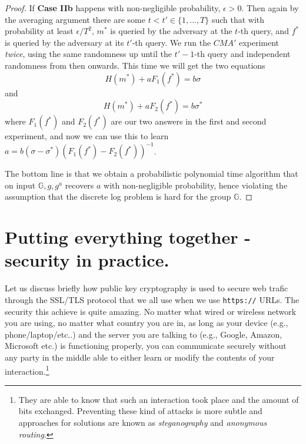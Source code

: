 \begin{proof}
If \textbf{Case IIb} happens with non-negligible probability,
\(\epsilon>0\). Then again by the averaging argument there are some
\(t< t' \in \{1,\ldots,T\}\) such that with probability at least
\(\epsilon/T^2\), \(m^*\) is queried by the adversary at the \(t\)-th
query, and \(f^*\) is queried by the adversary at its \(t'\)-th query.
We run the \(\ensuremath{\mathit{CMA}}'\) experiment \emph{twice}, using
the same randomness up until the \(t'-1\)-th query and independent
randomness from then onwards. This time we will get the two equations
\[H(m^*)+aF_1(f^*) = b\sigma\] and \[H(m^*)+aF_2(f^*)=b\sigma^*\] where
\(F_1(f^*)\) and \(F_2(f^*)\) are our two answers in the first and
second experiment, and now we can use this to learn
\(a= b(\sigma-\sigma^*)(F_1(f^*)-F_2(f^*))^{-1}\).

The bottom line is that we obtain a probabilistic polynomial time
algorithm that on input \(\mathbb{G},g,g^a\) recovers \(a\) with
non-negligible probability, hence violating the assumption that the
discrete log problem is hard for the group \(\mathbb{G}\).

\end{proof}

\hypertarget{nonromsec}{}

\section{Putting everything together - security in
practice.}\label{Putting-everything-together---}

Let us discuss briefly how public key cryptography is used to secure web
trafic through the SSL/TLS protocol that we all use when we use
\texttt{https://} URLs. The security this achieve is quite amazing. No
matter what wired or wireless network you are using, no matter what
country you are in, as long as your device (e.g., phone/laptop/etc..)
and the server you are talking to (e.g., Google, Amazon, Microsoft etc.)
is functioning properly, you can communicate securely without any party
in the middle able to either learn or modify the contents of your
interaction.\footnote{They are able to know that such an interaction
  took place and the amount of bits exchanged. Preventing these kind of
  attacks is more subtle and approaches for solutions are known as
  \emph{steganography} and \emph{anonymous routing}.}

